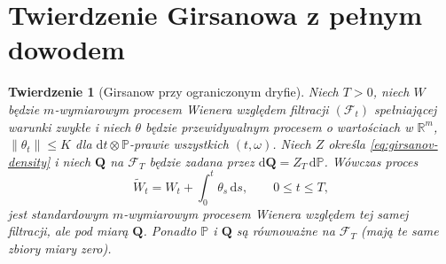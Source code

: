 \documentclass[11pt,a4paper,oneside]{report}
\numberwithin{equation}{chapter}
\theoremstyle{plain}
\newtheorem{twierdzenie}{Twierdzenie}[chapter]
\theoremstyle{definition}
\theoremstyle{remark}
\newcommand{\R}{\mathbb{R}}
\newcommand{\Prob}{\mathbb{P}}
\newcommand{\calF}{\mathcal{F}}
\newcommand{\dd}{\mathrm{d}}
\newcommand{\norm}[1]{\lVert #1\rVert}
\begin{document}
\section{Twierdzenie Girsanowa z pełnym dowodem}

\begin{twierdzenie}[Girsanow przy ograniczonym dryfie]
\label{th:girsanov-bounded}
Niech $T>0$, niech $W$ będzie $m$-wymiarowym
procesem Wienera względem filtracji $(\calF_t)$
spełniającej warunki zwykłe i niech $\theta$ będzie
przewidywalnym procesem o wartościach w $\R^m$,
$\norm{\theta_t}\le K$ dla $\dd t\otimes\Prob$-prawie
wszystkich $(t,\omega)$. Niech $Z$ określa
\eqref{eq:girsanov-density} i niech $\mathbf Q$ na
$\calF_T$ będzie zadana przez $\dd\mathbf Q=Z_T\,\dd\Prob$.
Wówczas proces
\[
\widetilde W_t=W_t+\int_0^t\theta_s\,\dd s,
\qquad 0\le t\le T,
\tag{8.5}\label{eq:shifted-wiener}
\]
jest standardowym $m$-wymiarowym procesem Wienera
względem tej samej filtracji, ale pod miarą $\mathbf Q$.
Ponadto $\Prob$ i $\mathbf Q$ są równoważne na
$\calF_T$ (mają te same zbiory miary zero).
\end{twierdzenie}
\end{document}
